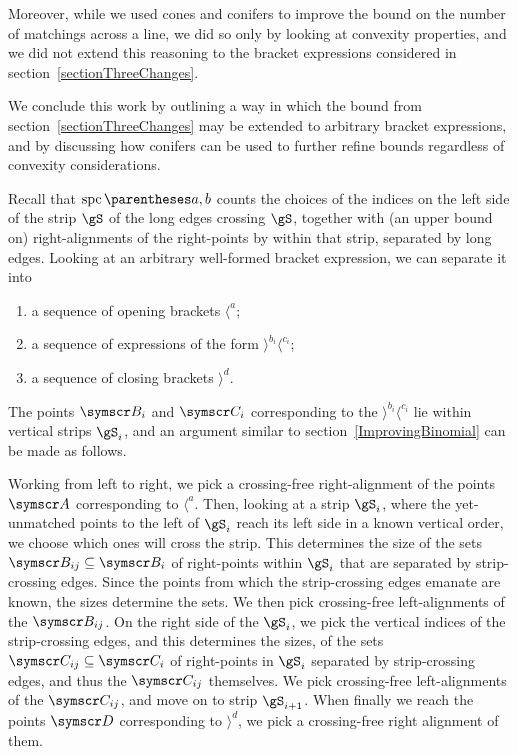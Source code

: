 Moreover, while we used cones and conifers to improve the bound on the number of matchings across a
line, we did so only by looking at convexity properties, and we did not extend this reasoning
to the bracket expressions considered in section~\ref{sectionThreeChanges}.

We conclude this work by outlining a way in which the bound from section~\ref{sectionThreeChanges}
may be extended to arbitrary bracket expressions, and by discussing how conifers can be used to further
refine bounds regardless of convexity considerations.

Recall that $\spc\of{a, b}$ counts the choices of the indices on the left side of the strip $\gS$
of the long edges crossing $\gS$, together with (an upper bound on) right-alignments of the
right-points by within that strip, separated by long edges.
Looking at an arbitrary well-formed bracket expression, we can separate it into\begin{enumerate}
\item a sequence of opening brackets $\langle^a$;
\item a sequence of expressions of the form $\rangle^{b_i}\langle^{c_i}$;
\item a sequence of closing brackets $\rangle^d$.
\end{enumerate}
The points $\pointset B_i$ and $\pointset C_i$ corresponding to the $\rangle^{b_i}\langle^{c_i}$ lie
within vertical strips $\gS_i$, and an
argument similar to section~\ref{ImprovingBinomial} can be made as follows.

Working from left to right, we pick a crossing-free right-alignment of the points $\pointset A$ corresponding
to $\langle^a$. Then, looking at a strip $\gS_i$, where the yet-unmatched points to the left of $\gS_i$ reach
its left side in a known vertical order, we choose which ones will cross the strip. This determines the size of
the sets $\pointset B_{ij} \Subset \pointset B_i$ of right-points within $\gS_i$ that are separated
by strip-crossing edges. Since the points from which the strip-crossing edges emanate are known,
the sizes determine the sets. We then pick crossing-free left-alignments of the $\pointset B_{ij}$.
On the right side of the $\gS_i$, we pick the vertical indices of the
strip-crossing edges, and this determines the sizes, of the sets $\pointset C_{ij}\Subset \pointset C_i$
of right-points in $\gS_i$ separated by strip-crossing edges, and thus the $\pointset C_{ij}$ themselves.
We pick crossing-free left-alignments of the $\pointset C_{ij}$, and move on to strip $\gS_{i+1}$.
When finally we reach the points $\pointset D$ corresponding to $\rangle^d$, we pick a crossing-free right
alignment of them.

